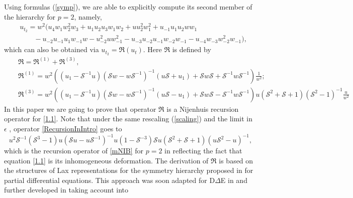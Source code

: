 \documentclass{article}
\numberwithin{equation}{section}
\begin{document}
Using formulas (\ref{symp}), we are able to explicitly compute its second member of the hierarchy for $p=2$, namely,
	\begin{equation}
		\begin{split}
			&u_{t_2} =w^2 (u_4 w_1 w_2^2 w_3+u_1 u_2 u_3 w_1 w_2+u u_2^2 w_1^2+u_{-1} u_1 u_2 w w_1 \\& \qquad
			-u_{-2} u_{-1} u_1 w_{-1} w-u_{-2}^2 u w_{-1}^2  -u_{-3} u_{-2} u_{-1} w_{-2} w_{-1}-u_{-4} w_{-3} w_{-2}^2 w_{-1}),
		\end{split} \label{5.9}
	\end{equation}
which can also be obtained via $u_{t_2}=\mathfrak{R} \left(u_t \right)$.
Here $\mathfrak{R}$ is defined by
	\begin{eqnarray}
			&& \mathfrak{R} = 
\mathfrak{R}^{(1)}+\mathfrak{R}^{(3)},\label{RecursionInIntro}\\
			&& \mathfrak{R}^{(1)} =w^2 \left(\left( {u_1}- \mathcal{S}^{-1} 
u\right) \left(\mathcal{S}w - w \mathcal{S}^{-1}\right)^{-1} \left(  u 
\mathcal{S} + u_1\right)+\mathcal{S}w \mathcal{S} 
+\mathcal{S}^{-1} w \mathcal{S}^{-1}\right)\frac{1}{w^2};\nonumber \\
			&& \mathfrak{R}^{(3)} =w^2\left(\left( 
{u_1}-\mathcal{S}^{-1} u \right) \left(\mathcal{S}w - w 
\mathcal{S}^{-1}\right)^{-1} \left(u \mathcal{S}-u_1\right) + \mathcal{S} 
w\mathcal{S} -  \mathcal{S}^{-1}w \mathcal{S}^{-1}\right) 
u\left(\mathcal{S}^2+\mathcal{S }+1\right) (\mathcal{S}^2-1)^{-1}\frac{u}{w^2} \nonumber
	\end{eqnarray}
In this paper we are going to prove that operator $\mathfrak{R}$ is a Nijenhuis recursion operator for \eqref{1.1}. Note that under the same rescaling (\ref{scaling}) and the
limit in $\epsilon$ , operator \eqref{RecursionInIntro} goes to
\begin{equation*}
 u^2 \mathcal{S}^{-1}\left(\mathcal{S}^3 -1\right) u \left( \mathcal{S} u- u 
\mathcal{S}^{-1}\right)^{-1} u\left(1 - \mathcal{S}^{-3}\right)
 \mathcal{S} u\left(\mathcal{S}^2+\mathcal{S}+1\right)\left(u \mathcal{S}^2-u 
\right)^{-1},
	\end{equation*}
which is the recursion operator of \eqref{mNIB} for $p=2$ in \cite{7} 
reflecting the fact that equation \eqref{1.1} is its inhomogeneous
deformation.
The derivation of $\mathfrak{R}$ is based on the structures of Lax 
representations for the symmetry hierarchy proposed in
\cite{48} 
for partial differential equations. This approach was soon adapted for 
D$\Delta$E in \cite{58} and further developed in \cite{7,1} taking account into 
\end{document}
